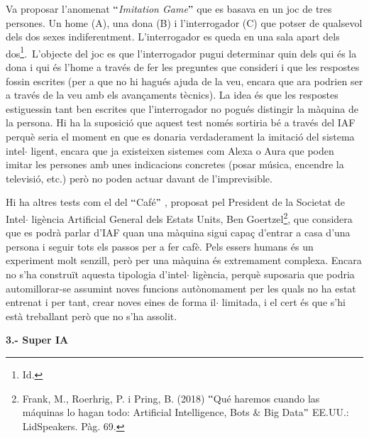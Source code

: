 \documentclass[12pt]{article}
\begin{document}
\vspace{\baselineskip}
\begin{justify}
Va proposar l’anomenat $``$\textit{Imitation Game}$"$  que es basava en un joc de tres persones. Un home (A), una dona (B) i l’interrogador (C) que potser de qualsevol dels dos sexes indiferentment. L’interrogador es queda en una sala apart dels dos\footnote{ Id. }.\  L’objecte del joc es que l’interrogador pugui determinar quin dels qui és la dona i qui és l’home a través de fer les preguntes que consideri i que les respostes fossin escrites (per a que no hi hagués ajuda de la veu, encara que ara podrien ser a través de la veu amb els avançaments tècnics). La idea és que les respostes estiguessin tant ben escrites que l’interrogador no pogués distingir la màquina de la persona. Hi ha la suposició que aquest test només sortiria bé a través del IAF perquè seria el moment en que es donaria verdaderament la imitació del sistema intel$ \cdot $ ligent, encara que ja existeixen sistemes com Alexa o Aura que poden imitar les persones amb unes indicacions concretes (posar música, encendre la televisió, etc.) però no poden actuar davant de l’imprevisible.
\end{justify}\par


\vspace{\baselineskip}
\begin{justify}
Hi ha altres tests com el del $``$Café$"$ , proposat pel President de la Societat de Intel$ \cdot $ ligència Artificial General dels Estats Units, Ben Goertzel\footnote{ Frank, M., Roerhrig, P. i Pring, B. (2018) $``$Qué haremos cuando las máquinas lo hagan todo: Artificial Intelligence, Bots $\&$  Big Data$"$  EE.UU.: LidSpeakers. Pàg. 69. }, que considera que es podrà parlar d’IAF quan una màquina sigui capaç d’entrar a casa d’una persona i seguir tots els passos per a fer cafè. Pels essers humans és un experiment molt senzill, però per una màquina és extremament complexa. Encara no s’ha construït aquesta tipologia d’intel$ \cdot $ ligència, perquè suposaria que podria automillorar-se assumint noves funcions autònomament per les quals no ha estat entrenat i per tant, crear noves eines de forma il$ \cdot $ limitada, i el cert és que s’hi està treballant però que no s’ha assolit. 
\end{justify}\par


\vspace{\baselineskip}
\textbf{3.- Super IA}\par
\end{document}
